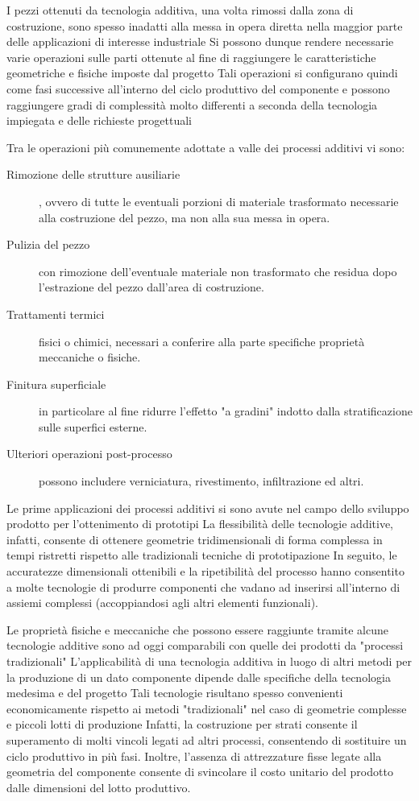 I pezzi ottenuti da tecnologia additiva, una volta rimossi dalla zona di costruzione, sono
spesso inadatti alla messa in opera diretta nella maggior parte delle applicazioni di interesse
industriale
Si possono dunque rendere necessarie varie operazioni sulle parti ottenute al fine di
raggiungere le caratteristiche geometriche e fisiche imposte dal progetto
Tali operazioni si configurano quindi come fasi successive all'interno del ciclo produttivo del
componente e possono raggiungere gradi di complessità molto differenti a seconda della
tecnologia impiegata e delle richieste progettuali

Tra le operazioni più comunemente adottate a valle dei processi additivi vi sono:
\begin{description}
\item[Rimozione delle strutture ausiliarie], ovvero di tutte le eventuali porzioni di materiale
trasformato necessarie alla costruzione del pezzo, ma non alla sua messa in opera.
\item[Pulizia del pezzo] con rimozione dell'eventuale materiale non trasformato che residua dopo
l'estrazione del pezzo dall'area di costruzione.
\item[Trattamenti termici] fisici o chimici, necessari a conferire alla parte specifiche proprietà meccaniche o fisiche.
\item[Finitura superficiale] in particolare al fine ridurre l'effetto "a gradini" indotto dalla
stratificazione sulle superfici esterne.
\item[Ulteriori operazioni post-processo] possono includere verniciatura, rivestimento, infiltrazione ed altri.
\end{description}

Le prime applicazioni dei processi additivi si sono avute nel campo dello sviluppo prodotto
per l'ottenimento di prototipi
La flessibilità delle tecnologie additive, infatti, consente di ottenere geometrie tridimensionali
di forma complessa in tempi ristretti rispetto alle tradizionali tecniche di prototipazione
In seguito, le accuratezze dimensionali ottenibili e la ripetibilità del processo hanno
consentito a molte tecnologie di produrre componenti che vadano ad inserirsi all'interno di
assiemi complessi (accoppiandosi agli altri elementi funzionali).

Le proprietà fisiche e meccaniche che possono essere raggiunte tramite alcune tecnologie
additive sono ad oggi comparabili con quelle dei prodotti da "processi tradizionali"
L'applicabilità di una tecnologia additiva in luogo di altri metodi per la produzione di un dato
componente dipende dalle specifiche della tecnologia medesima e del progetto
Tali tecnologie risultano spesso convenienti economicamente rispetto ai metodi
"tradizionali" nel caso di geometrie complesse e piccoli lotti di produzione
Infatti, la costruzione per strati consente il superamento di molti vincoli legati ad altri
processi, consentendo di sostituire un ciclo produttivo in più fasi.
Inoltre, l'assenza di attrezzature fisse legate alla geometria del componente consente di
svincolare il costo unitario del prodotto dalle dimensioni del lotto produttivo.


